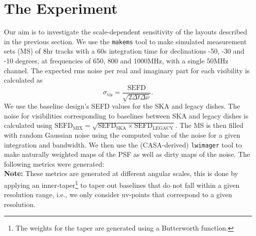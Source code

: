 \documentclass[sfheadings,a4paper,times,9pt,floats,floatfix]{article}
\begin{document}
\section{The Experiment}\label{sec:exp}
Our aim is to investigate the scale-dependent sensitivity of the layouts described in the previous section.
We use the \texttt{makems} tool to make simulated measurement sets (MS) of 8hr tracks with a 60s integration time for
declinations -50, -30 and -10 degrees, at frequencies of 650, 800 and 1000MHz, with a single 50MHz channel. The expected rms noise
per real
and imaginary part for each visibility is calculated as 
\begin{equation}
\sigma_{\text{vis}} = \frac{\text{SEFD}}{\sqrt{2\Delta t\Delta \nu}}.
\end{equation}
We use the baseline design's SEFD values for the SKA and legacy dishes. The noise for visibilities corresponding to baselines
between SKA and legacy dishes is calculated using $\text{SEFD}_{\text{MIX}}=\sqrt{\text{SEFD}_{\text{SKA}} \times
\text{SEFD}_{\text{LEGACY}}}$. The MS is then filled with random Gaussian noise using the computed value of the noise for a
given integration and bandwidth. We then use the (CASA-derived) \texttt{lwimager} tool to make naturally weighted maps of the PSF
as well as dirty maps of the noise. The following metrics were generated:\\ {\bf Note:} These metrics are generated at different
angular scales, this is done by applying an inner-taper\footnote{The weights for the taper are generated using a Butterworth
function.} to taper out baselines that do not fall within a given resolution range, i.e., we only consider uv-points that
correspond to a given resolution.
\end{document}
